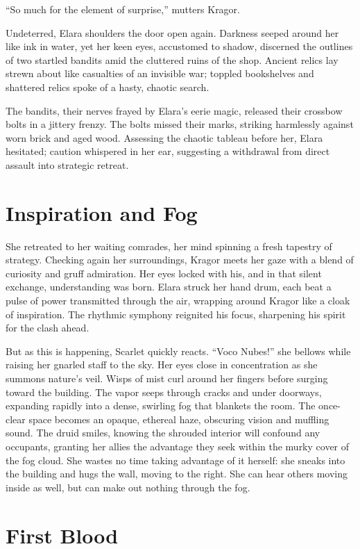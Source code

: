 \documentclass[
  12pt,twoside,twocolumn,openany,nodeprecatedcode]{dndbook}
\begin{document}
``So much for the element of surprise,'' mutters Kragor.

Undeterred, Elara shoulders the door open again. Darkness seeped around
her like ink in water, yet her keen eyes, accustomed to shadow,
discerned the outlines of two startled bandits amid the cluttered ruins
of the shop. Ancient relics lay strewn about like casualties of an
invisible war; toppled bookshelves and shattered relics spoke of a
hasty, chaotic search.

The bandits, their nerves frayed by Elara's eerie magic, released their
crossbow bolts in a jittery frenzy. The bolts missed their marks,
striking harmlessly against worn brick and aged wood. Assessing the
chaotic tableau before her, Elara hesitated; caution whispered in her
ear, suggesting a withdrawal from direct assault into strategic retreat.

\section{Inspiration and Fog}\label{inspiration-and-fog}

She retreated to her waiting comrades, her mind spinning a fresh
tapestry of strategy. Checking again her surroundings, Kragor meets her
gaze with a blend of curiosity and gruff admiration. Her eyes locked
with his, and in that silent exchange, understanding was born. Elara
struck her hand drum, each beat a pulse of power transmitted through the
air, wrapping around Kragor like a cloak of inspiration. The rhythmic
symphony reignited his focus, sharpening his spirit for the clash ahead.

But as this is happening, Scarlet quickly reacts. ``Voco Nubes!'' she
bellows while raising her gnarled staff to the sky. Her eyes close in
concentration as she summons nature's veil. Wisps of mist curl around
her fingers before surging toward the building. The vapor seeps through
cracks and under doorways, expanding rapidly into a dense, swirling fog
that blankets the room. The once-clear space becomes an opaque, ethereal
haze, obscuring vision and muffling sound. The druid smiles, knowing the
shrouded interior will confound any occupants, granting her allies the
advantage they seek within the murky cover of the fog cloud. She wastes
no time taking advantage of it herself: she sneaks into the building and
hugs the wall, moving to the right. She can hear others moving inside as
well, but can make out nothing through the fog.

\section{First Blood}\label{first-blood}
\end{document}
